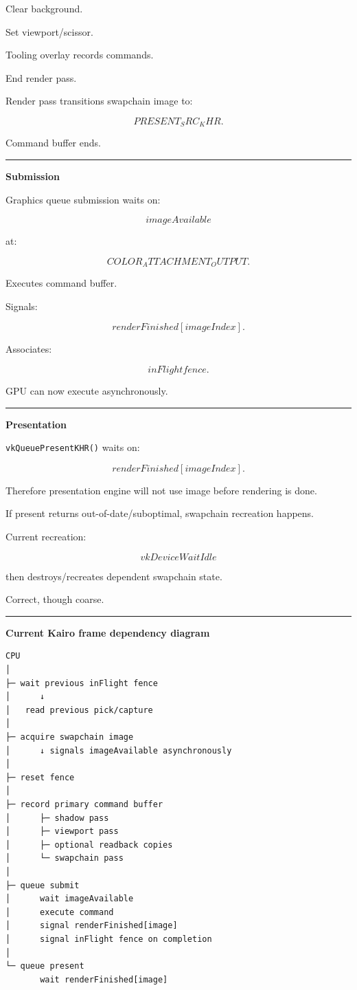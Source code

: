Clear background.

Set viewport/scissor.

Tooling overlay records commands.

End render pass.

Render pass transitions swapchain image to:

\[
PRESENT_SRC_KHR.
\]

Command buffer ends.

\begin{center}\rule{0.5\linewidth}{0.5pt}\end{center}

\textbf{Submission}

Graphics queue submission waits on:

\[
imageAvailable
\]

at:

\[
COLOR_ATTACHMENT_OUTPUT.
\]

Executes command buffer.

Signals:

\[
renderFinished[imageIndex].
\]

Associates:

\[
inFlight fence.
\]

GPU can now execute asynchronously.

\begin{center}\rule{0.5\linewidth}{0.5pt}\end{center}

\textbf{Presentation}

\texttt{vkQueuePresentKHR()} waits on:

\[
renderFinished[imageIndex].
\]

Therefore presentation engine will not use image before rendering is done.

If present returns out-of-date/suboptimal, swapchain recreation happens.

Current recreation:

\[
vkDeviceWaitIdle
\]

then destroys/recreates dependent swapchain state.

Correct, though coarse.

\begin{center}\rule{0.5\linewidth}{0.5pt}\end{center}

\textbf{Current Kairo frame dependency diagram}

\begin{verbatim}
CPU
│
├─ wait previous inFlight fence
│      ↓
│   read previous pick/capture
│
├─ acquire swapchain image
│      ↓ signals imageAvailable asynchronously
│
├─ reset fence
│
├─ record primary command buffer
│      ├─ shadow pass
│      ├─ viewport pass
│      ├─ optional readback copies
│      └─ swapchain pass
│
├─ queue submit
│      wait imageAvailable
│      execute command
│      signal renderFinished[image]
│      signal inFlight fence on completion
│
└─ queue present
       wait renderFinished[image]
\end{verbatim}

